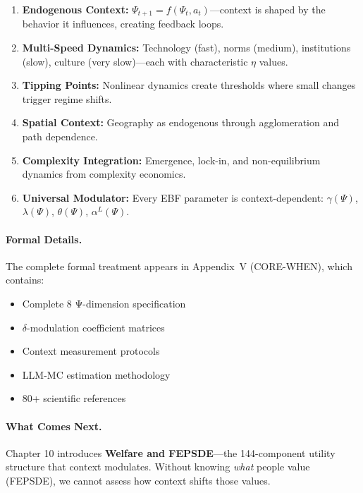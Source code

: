 \begin{enumerate}
    \item \textbf{Endogenous Context:} $\Psi_{t+1} = f(\Psi_t, a_t)$---context is shaped
          by the behavior it influences, creating feedback loops.

    \item \textbf{Multi-Speed Dynamics:} Technology (fast), norms (medium), institutions (slow),
          culture (very slow)---each with characteristic $\eta$ values.

    \item \textbf{Tipping Points:} Nonlinear dynamics create thresholds where small
          changes trigger regime shifts.

    \item \textbf{Spatial Context:} Geography as endogenous through agglomeration
          and path dependence.

    \item \textbf{Complexity Integration:} Emergence, lock-in, and non-equilibrium
          dynamics from complexity economics.

    \item \textbf{Universal Modulator:} Every EBF parameter is context-dependent:
          $\gamma(\Psi)$, $\lambda(\Psi)$, $\theta(\Psi)$, $\alpha^L(\Psi)$.
\end{enumerate}

\paragraph{Formal Details.}
The complete formal treatment appears in Appendix~V (CORE-WHEN), which contains:
\begin{itemize}[nosep]
    \item Complete 8 Ψ-dimension specification
    \item $\delta$-modulation coefficient matrices
    \item Context measurement protocols
    \item LLM-MC estimation methodology
    \item 80+ scientific references
\end{itemize}

\paragraph{What Comes Next.}
Chapter 10 introduces \textbf{Welfare and FEPSDE}---the 144-component utility structure
that context modulates. Without knowing \emph{what} people value (FEPSDE), we cannot
assess how context shifts those values.

